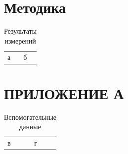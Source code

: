 
\section{Методика}

\begin{table}
  \caption{Результаты измерений}
  \begin{tabular}{ll}
    а & б \\
  \end{tabular}
\end{table}

\section*{ПРИЛОЖЕНИЕ А}

\begin{table}
  \caption{Вспомогательные данные}
  \begin{tabular}{ll}
    в & г \\
  \end{tabular}
\end{table}
